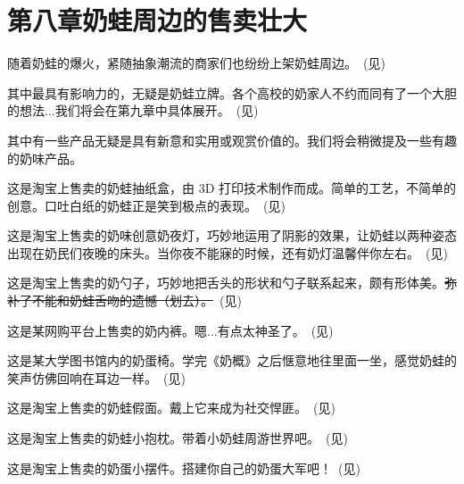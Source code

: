
\clearpage
\section{第八章\quad 奶蛙周边的售卖壮大}

随着奶蛙的爆火，紧随抽象潮流的商家们也纷纷上架奶蛙周边。~(见)





其中最具有影响力的，无疑是奶蛙立牌。各个高校的奶家人不约而同有了一个大胆的想法...我们将会在第九章中具体展开。~(见)

其中有一些产品无疑是具有新意和实用或观赏价值的。我们将会稍微提及一些有趣的奶味产品。

\clearpage
这是淘宝上售卖的奶蛙抽纸盒，由 3D 打印技术制作而成。简单的工艺，不简单的创意。口吐白纸的奶蛙正是笑到极点的表现。~(见)



这是淘宝上售卖的奶味创意奶夜灯，巧妙地运用了阴影的效果，让奶蛙以两种姿态出现在奶民们夜晚的床头。当你夜不能寐的时候，还有奶灯温馨伴你左右。~(见)



这是淘宝上售卖的奶勺子，巧妙地把舌头的形状和勺子联系起来，颇有形体美。\sout{弥补了不能和奶蛙舌吻的遗憾（划去）。}~(见)



这是某网购平台上售卖的奶内裤。嗯...有点太神圣了。~(见)



\clearpage
这是某大学图书馆内的奶蛋椅。学完《奶概》之后惬意地往里面一坐，感觉奶蛙的笑声仿佛回响在耳边一样。~(见)



这是淘宝上售卖的奶蛙假面。戴上它来成为社交悍匪。~(见)



这是淘宝上售卖的奶蛙小抱枕。带着小奶蛙周游世界吧。~(见)



这是淘宝上售卖的奶蛋小摆件。搭建你自己的奶蛋大军吧！~(见)



